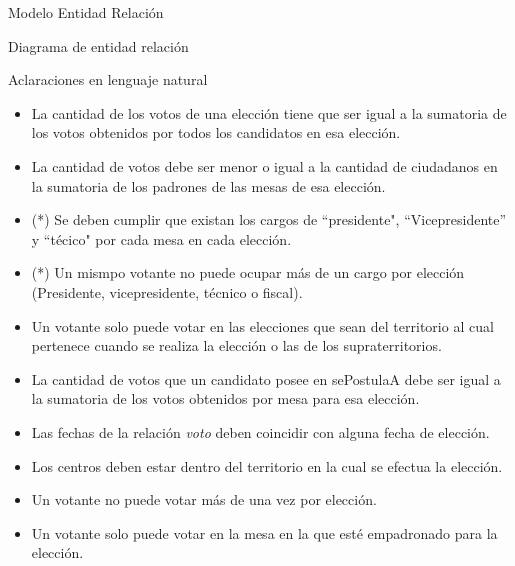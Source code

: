 \begin{section}{Modelo Entidad Relaci\'on}

\begin{subsection}{Diagrama de entidad relaci\'on}


\end{subsection}

\begin{subsection}{Aclaraciones en lenguaje natural}

\begin{itemize}

\item La cantidad de los votos de una elecci\'on tiene que ser igual a la sumatoria de los votos obtenidos por todos los candidatos en esa elecci\'on.

\item La cantidad de votos debe ser menor o igual a la cantidad de ciudadanos en la sumatoria de los padrones de las mesas de esa elecci\'on.

\item (*) Se deben cumplir que existan los cargos de ``presidente", ``Vicepresidente'' y ``t\'ecico" por cada mesa en cada elecci\'on.

\item (*) Un mismpo votante no puede ocupar m\'as de un cargo por elecci\'on (Presidente, vicepresidente, t\'ecnico o fiscal).

\item Un votante solo puede votar en las elecciones que sean del territorio al cual pertenece cuando se realiza la elecci\'on o las de los supraterritorios.

\item La cantidad de votos que un candidato posee en sePostulaA debe ser igual a la sumatoria de los votos obtenidos por mesa para esa elecci\'on.

\item Las fechas de la relaci\'on \textit{voto} deben coincidir con alguna fecha de elecci\'on.

\item Los centros deben estar dentro del territorio en la cual se efectua la elecci\'on.

\item Un votante no puede votar m\'as de una vez por elecci\'on.

\item Un votante solo puede votar en la mesa en la que est\'e empadronado para la elecci\'on.

\end{itemize}

\end{subsection}

\end{section}
